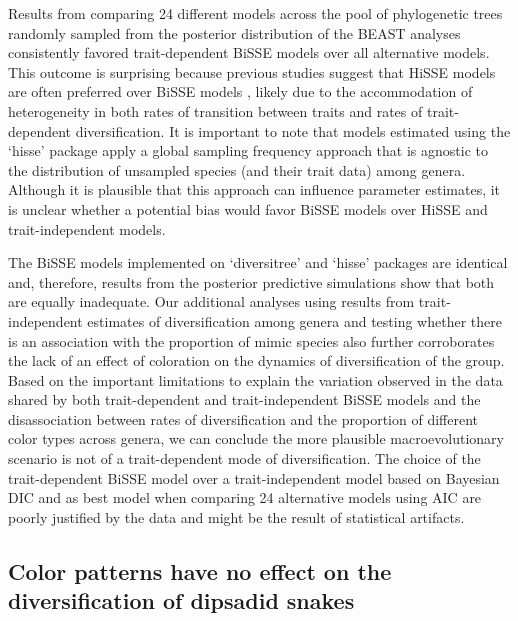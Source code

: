 Results from comparing 24 different models across the pool of phylogenetic trees randomly sampled from the posterior distribution of the BEAST analyses consistently favored trait-dependent BiSSE models over all alternative models. This outcome is surprising because previous studies suggest that HiSSE models are often preferred over BiSSE models \citep[e.g.,][]{beaulieu_detecting_2016, frederich_2016}, likely due to the accommodation of heterogeneity in both rates of transition between traits and rates of trait-dependent diversification. It is important to note that models estimated using the `hisse' package \citep{beaulieu_detecting_2016} apply a global sampling frequency approach that is agnostic to the distribution of unsampled species (and their trait data) among genera. Although it is plausible that this approach can influence parameter estimates, it is unclear whether a potential bias would favor BiSSE models over HiSSE and trait-independent models.

The BiSSE models implemented on `diversitree' \citep{fitzjohn_2012} and `hisse' \citep{beaulieu_detecting_2016} packages are identical and, therefore, results from the posterior predictive simulations show that both are equally inadequate. Our additional analyses using results from trait-independent estimates of diversification among genera and testing whether there is an association with the proportion of mimic species also further corroborates the lack of an effect of coloration on the dynamics of diversification of the group. Based on the important limitations to explain the variation observed in the data shared by both trait-dependent and trait-independent BiSSE models and the disassociation between rates of diversification and the proportion of different color types across genera, we can conclude the more plausible macroevolutionary scenario is not of a trait-dependent mode of diversification. The choice of the trait-dependent BiSSE model over a trait-independent model based on Bayesian DIC and as best model when comparing 24 alternative models using AIC are poorly justified by the data and might be the result of statistical artifacts.

\subsection{Color patterns have no effect on the diversification of dipsadid snakes}

